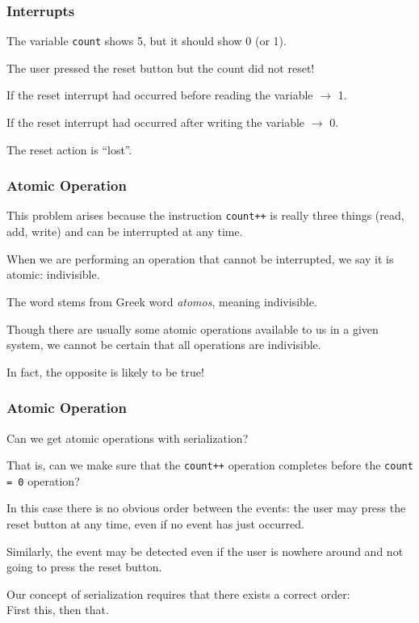 \begin{frame}
\frametitle{Interrupts}

The variable \texttt{count} shows 5, but it should show 0 (or 1).

The user pressed the reset button but the count did not reset! 

If the reset interrupt had occurred before reading the variable $\rightarrow$ 1.

If the reset interrupt had occurred after writing the variable $\rightarrow$ 0.

The reset action is ``lost''.

\end{frame}

\begin{frame}
\frametitle{Atomic Operation}

This problem arises because the instruction \texttt{count++} is really three things (read, add, write) and can be interrupted at any time. 

When we are performing an operation that cannot be interrupted, we say it is \alert{atomic}: indivisible. 

The word stems from Greek word \textit{atomos}, meaning indivisible. 

Though there are usually some atomic operations available to us in a given system, we cannot be certain that all operations are indivisible. 

In fact, the opposite is likely to be true!

\end{frame}

\begin{frame}
\frametitle{Atomic Operation}

Can we get atomic operations with serialization?

That is, can we make sure that the \texttt{count++} operation completes before the \texttt{count = 0} operation? 

In this case there is no obvious order between the events: the user may press the reset button at any time, even if no event has just occurred. 

Similarly, the event may be detected even if the user is nowhere around and not going to press the reset button. 

Our concept of serialization requires that there exists a correct order:\\
\quad First this, then that. 


\end{frame}

